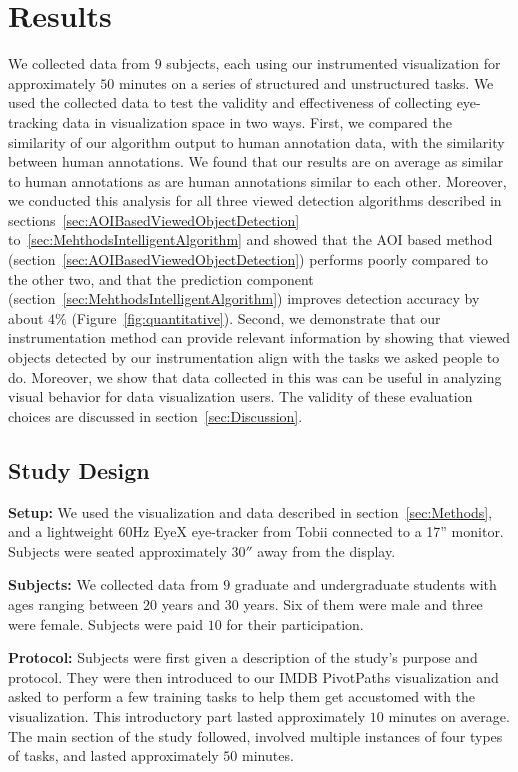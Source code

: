 \section{Results}
\label{sec:Evaluation}
We collected data from $9$ subjects, each using our instrumented visualization for approximately $50$ minutes on a series of structured and unstructured tasks. We used the collected data to test the validity and effectiveness of collecting eye-tracking data in visualization space in two ways. 
First, we compared the similarity of our algorithm output to human annotation data, with the similarity between human annotations. We found that our results are on average as similar to human annotations as are human annotations similar to each other. Moreover, we conducted this analysis for all three viewed detection algorithms described in sections~\ref{sec:AOIBasedViewedObjectDetection} to~\ref{sec:MehthodsIntelligentAlgorithm} and showed that the AOI based method (section~\ref{sec:AOIBasedViewedObjectDetection}) performs poorly compared to the other two, and that the prediction component (section~\ref{sec:MehthodsIntelligentAlgorithm}) improves detection accuracy by about $4\%$  (Figure~\ref{fig:quantitative}). 
Second, we demonstrate that our instrumentation method can provide relevant information by showing that viewed objects detected by our instrumentation align with the tasks we asked people to do. Moreover, we show that data collected in this was can be useful in analyzing visual behavior for data visualization users.  
The validity of these evaluation choices are discussed in section~\ref{sec:Discussion}.

\subsection{Study Design }

\textbf{Setup: } We used the visualization and data described in section~\ref{sec:Methods}, and a lightweight $60$Hz EyeX eye-tracker from Tobii connected to a 17'' monitor. Subjects were seated approximately $30''$ away from the display. 

\textbf{Subjects:} We collected data from $9$ graduate and undergraduate students with ages ranging between $20$ years and $30$ years. Six of them were male and three were female. Subjects were paid $10$ for their participation. 

\textbf{Protocol:} Subjects were first given a description of the study's purpose and protocol. They were then introduced to our IMDB PivotPaths visualization and asked to perform a few training tasks to help them get accustomed with the visualization. This introductory part lasted approximately $10$ minutes on average. The main section of the study followed, involved multiple instances of four types of tasks, and lasted approximately $50$ minutes. 


